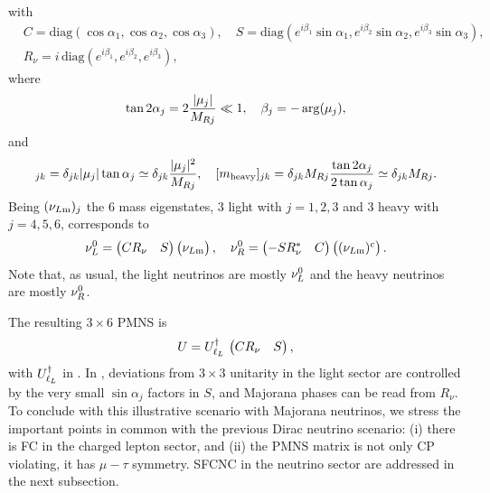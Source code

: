 \documentclass[12pt,a4paper]{article}
\begin{document}
with
\begin{equation}
\begin{aligned}
 &C=\text{diag}(\cos\alpha_1,\cos\alpha_2,\cos\alpha_3),\quad S=\text{diag}(e^{i\beta_1}\sin\alpha_1,e^{i\beta_2}\sin\alpha_2,e^{i\beta_3}\sin\alpha_3),\\
 &R_\nu=i\,\text{diag}(e^{i\beta_1},e^{i\beta_2},e^{i\beta_3}),
\end{aligned}
\end{equation}
where
\begin{equation}\label{eq:Majorana:LHmix}
 \tan 2\alpha_j=2\frac{|\mu_j|}{M_{Rj}}\ll 1,\quad \beta_j=-\arg(\mu_j),
\end{equation}
and
\begin{equation}
 [m_{\rm light}]_{jk}=\delta_{jk}\abs{\mu_j}\tan\alpha_j\simeq \delta_{jk}\frac{\abs{\mu_j}^2}{M_{Rj}},\quad [m_{\rm heavy}]_{jk}=\delta_{jk}M_{Rj}\frac{\tan2\alpha_j}{2\tan\alpha_j}\simeq \delta_{jk}M_{Rj}.
\end{equation}
Being $(\nu_{L{\rm m}})_j$ the 6 mass eigenstates, 3 light with $j=1,2,3$ and 3 heavy with $j=4,5,6$,  corresponds to
\begin{equation}\label{eq:Neutrinos:LRMass}
 \nu_L^0=\begin{pmatrix}CR_\nu & S\end{pmatrix}\begin{pmatrix}\nu_{L{\rm m}}\end{pmatrix},\quad \nu_R^0=\begin{pmatrix}-SR_\nu^\ast & C\end{pmatrix}\begin{pmatrix}(\nu_{L{\rm m}})^c\end{pmatrix}.
\end{equation}
{\color{blue}}Note that, as usual, the light neutrinos are mostly $\nu_L^0$ and the heavy neutrinos are mostly $\nu_R^0$.

The resulting $3\times 6$ PMNS is
\begin{equation}\label{eq:PMNS:Majorana}
 U=U_{\ell_L}^{\dagger}\,\begin{pmatrix}CR_\nu & S\end{pmatrix},
\end{equation}
with $U_{\ell_L}^{\dagger}$ in . In , deviations from $3\times 3$ unitarity in the light sector are controlled by the very small $\sin\alpha_j$ factors in $S$, and Majorana phases can be read from $R_\nu$. To conclude with this illustrative scenario with Majorana neutrinos, we stress the important points in common with the previous Dirac neutrino scenario: (i) there is FC in the charged lepton sector, and (ii) the PMNS matrix is not only CP violating, it has $\mu-\tau$ symmetry. SFCNC in the neutrino sector are addressed in the next subsection.
\end{document}

